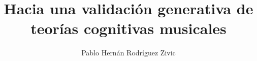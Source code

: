 \title{Hacia una validaci\'on generativa de teor\'ias cognitivas musicales}
\author{Pablo Hern\'an Rodr\'iguez Zivic}
\date{}
\maketitle
